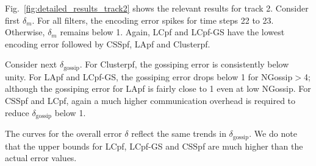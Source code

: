 \documentclass[10pt,letterpaper,final]{article}
\begin{document}
Fig.~\ref{fig:detailed_results_track2} shows the relevant results for track 2. Consider first $\delta_m$. For all filters, the encoding error spikes for time steps 22 to 23. Otherwise, $\delta_m$ remains below 1. Again, LCpf and LCpf-GS have the lowest encoding error followed by CSSpf, LApf and Clusterpf. 

Consider next $\delta_{\text{gossip}}$. For Clusterpf, the gossiping error is consistently below unity. For LApf and LCpf-GS, the gossiping error drops below 1 for NGossip$>$4; although the gossiping error for LApf is fairly close to 1 even at low NGossip. For CSSpf and LCpf, again a much higher communication overhead is required to reduce $\delta_{\text{gossip}}$ below 1. 

The curves for the overall error $\delta$ reflect the same trends in $\delta_{\text{gossip}}$. We do note that the upper bounds for LCpf, LCpf-GS and CSSpf are much higher than the actual error values. 
\end{document}
